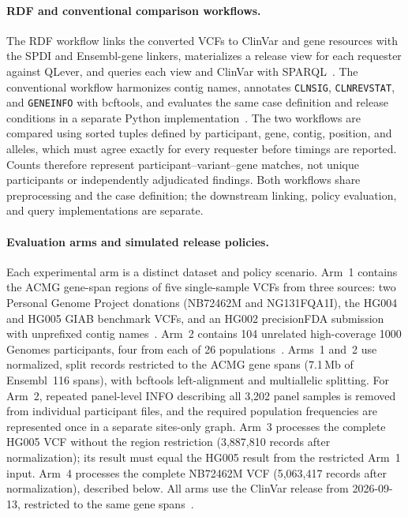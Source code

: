 \documentclass[11pt]{article}
\begin{document}
\paragraph{RDF and conventional comparison workflows.}
The RDF workflow links the converted VCFs to ClinVar and gene resources with the SPDI and Ensembl-gene linkers, materializes a release view for each requester against QLever, and queries each view and ClinVar with SPARQL~\cite{qlever_2017}.
The conventional workflow harmonizes contig names, annotates \texttt{CLNSIG}, \texttt{CLNREVSTAT}, and \texttt{GENEINFO} with bcftools, and evaluates the same case definition and release conditions in a separate Python implementation~\cite{BCFtools}.
The two workflows are compared using sorted tuples defined by participant, gene, contig, position, and alleles, which must agree exactly for every requester before timings are reported.
Counts therefore represent participant--variant--gene matches, not unique participants or independently adjudicated findings.
Both workflows share preprocessing and the case definition; the downstream linking, policy evaluation, and query implementations are separate.

\paragraph{Evaluation arms and simulated release policies.}
Each experimental arm is a distinct dataset and policy scenario.
Arm~1 contains the ACMG gene-span regions of five single-sample VCFs from three sources: two Personal Genome Project donations (NB72462M and NG131FQA1I), the HG004 and HG005 GIAB benchmark VCFs, and an HG002 precisionFDA submission with unprefixed contig names~\cite{personal_genome_proj,giab_v421_2022}.
Arm~2 contains 104 unrelated high-coverage 1000 Genomes participants, four from each of 26 populations~\cite{byrska2022highcoverage}.
Arms~1 and~2 use normalized, split records restricted to the ACMG gene spans (7.1\,Mb of Ensembl~116 spans), with bcftools left-alignment and multiallelic splitting.
For Arm~2, repeated panel-level INFO describing all 3,202 panel samples is removed from individual participant files, and the required population frequencies are represented once in a separate sites-only graph.
Arm~3 processes the complete HG005 VCF without the region restriction (3,887,810 records after normalization); its result must equal the HG005 result from the restricted Arm~1 input.
Arm~4 processes the complete NB72462M VCF (5,063,417 records after normalization), described below.
All arms use the ClinVar release from 2026-09-13, restricted to the same gene spans~\cite{clinvar_vcf}.
\end{document}
